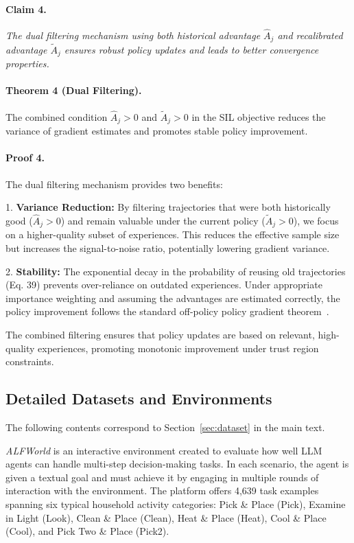 \documentclass[]{youtu} %
\begin{document}
{\paragraph{Claim 4.}\textit{The dual filtering mechanism using both historical advantage $\hat{A}_j$ and recalibrated advantage $\tilde{A}_j$ ensures robust policy updates and leads to better convergence properties.}

\paragraph{Theorem 4 (Dual Filtering).} The combined condition $\hat{A}_j > 0$ and $\tilde{A}_j > 0$ in the SIL objective reduces the variance of gradient estimates and promotes stable policy improvement.

\paragraph{Proof 4.} The dual filtering mechanism provides two benefits:

1. \textbf{Variance Reduction:} By filtering trajectories that were both historically good ($\hat{A}_j > 0$) and remain valuable under the current policy ($\tilde{A}_j > 0$), we focus on a higher-quality subset of experiences. This reduces the effective sample size but increases the signal-to-noise ratio, potentially lowering gradient variance.

2. \textbf{Stability:} The exponential decay in the probability of reusing old trajectories (Eq. 39) prevents over-reliance on outdated experiences. Under appropriate importance weighting and assuming the advantages are estimated correctly, the policy improvement follows the standard off-policy policy gradient theorem~\cite{degris2012off}.

The combined filtering ensures that policy updates are based on relevant, high-quality experiences, promoting monotonic improvement under trust region constraints.


}



\subsection{Detailed Datasets and Environments}
\label{sec:datasetdetails}

The following contents correspond to Section~\ref{sec:dataset} in the main text.


\textit{ALFWorld} is an interactive environment created to evaluate how well LLM agents can handle multi-step decision-making tasks. In each scenario, the agent is given a textual goal and must achieve it by engaging in multiple rounds of interaction with the environment. The platform offers 4,639 task examples spanning six typical household activity categories: Pick \& Place (Pick), Examine in Light (Look), Clean \& Place (Clean), Heat \& Place (Heat), Cool \& Place (Cool), and Pick Two \& Place (Pick2).
\end{document}
